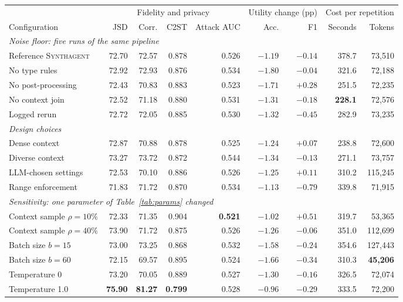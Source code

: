 \documentclass[conference]{IEEEtran}
\newcommand{\system}{\textsc{Synthagent}\xspace}
\newcommand{\best}[1]{\textbf{#1}}
\providecommand{\DIFaddbeginFL}{} %
\providecommand{\DIFaddendFL}{} %
\providecommand{\DIFdelendFL}{} %
\newcommand{\DIFaddincludegraphics}[2][]{{\color{blue}\fbox{\DIFOincludegraphics[#1]{#2}}}} %
\DeclareRobustCommand{\DIFaddbeginFL}{\DIFOaddbeginFL \let\includegraphics\DIFaddincludegraphics} %
\DeclareRobustCommand{\DIFaddendFL}{\DIFOaddendFL \let\includegraphics\DIFOincludegraphics} %
\DeclareRobustCommand{\DIFdelendFL}{\DIFOaddendFL \let\includegraphics\DIFOincludegraphics} %
\begin{document}
\begin{table}[t]
\DIFdelendFL \DIFaddbeginFL \begin{tabular*}{\textwidth}{@{\extracolsep{\fill}}lrrrrrrrr@{}}
\toprule
& \multicolumn{4}{c}{Fidelity and privacy} & \multicolumn{2}{c}{Utility change (pp)} & \multicolumn{2}{c}{Cost per repetition} \\
\cmidrule(lr){2-5}\cmidrule(lr){6-7}\cmidrule(l){8-9}
Configuration & JSD & Corr. & C2ST & Attack AUC & Acc. & F1 & Seconds & Tokens \\
\midrule
\multicolumn{9}{l}{\textit{Noise floor: five runs of the same pipeline}}\\
Reference \system & 72.70 & 72.57 & 0.878 & 0.526 & $-1.19$ & $-0.14$ & 378.7 & 73,510 \\
No type rules & 72.92 & 72.93 & 0.876 & 0.534 & $-1.80$ & $-0.04$ & 321.6 & 72,188 \\
No post-processing & 72.43 & 70.83 & 0.883 & 0.523 & $-1.71$ & $+0.28$ & 251.5 & 72,235 \\
No context join & 72.52 & 71.18 & 0.880 & 0.531 & $-1.31$ & $-0.18$ & \best{228.1} & 72,576 \\
Logged rerun & 72.72 & 72.05 & 0.885 & 0.530 & $-1.32$ & $-0.45$ & 282.9 & 73,235 \\
\midrule
\multicolumn{9}{l}{\textit{Design choices}}\\
Dense context & 72.87 & 70.88 & 0.878 & 0.525 & $-1.24$ & $+0.07$ & 238.8 & 72,600 \\
Diverse context & 73.27 & 73.72 & 0.872 & 0.544 & $-1.34$ & $-0.13$ & 271.1 & 73,757 \\
LLM-chosen settings & 72.53 & 70.10 & 0.886 & 0.526 & $-1.25$ & $+0.11$ & 310.2 & 115,245 \\
Range enforcement & 71.83 & 71.72 & 0.870 & 0.534 & $-1.13$ & $-0.79$ & 339.8 & 71,915 \\
\midrule
\multicolumn{9}{l}{\textit{Sensitivity: one parameter of Table~\ref{tab:params} changed}}\\
Context sample $\rho=10\%$ & 72.33 & 71.35 & 0.904 & \best{0.521} & $-1.02$ & \best{$+0.51$} & 319.7 & 53,365 \\
Context sample $\rho=40\%$ & 73.90 & 71.72 & 0.875 & 0.526 & $-1.26$ & $-0.06$ & 351.0 & 112,699 \\
Batch size $b=15$ & 73.00 & 73.25 & 0.868 & 0.532 & $-1.58$ & $-0.24$ & 354.6 & 127,443 \\
Batch size $b=60$ & 72.15 & 69.57 & 0.895 & 0.524 & $-1.66$ & $-0.34$ & 310.3 & \best{45,206} \\
Temperature 0 & 73.20 & 70.05 & 0.889 & 0.527 & $-1.30$ & $-0.16$ & 326.5 & 72,074 \\
Temperature 1.0 & \best{75.90} & \best{81.27} & \best{0.799} & 0.528 & \best{$-0.96$} & $-0.29$ & 333.5 & 72,200 \\
\bottomrule
\end{tabular*}
\DIFaddendFL \end{table}
\end{document}
